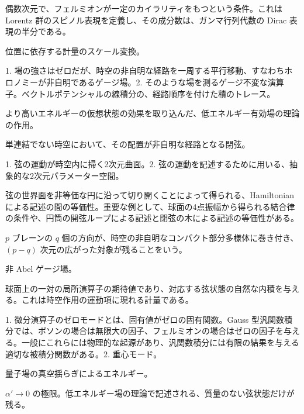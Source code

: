 {偶数次元で、フェルミオンが一定のカイラリティをもつという条件。これは Lorentz 群のスピノル表現を定義し、その成分数は、ガンマ行列代数の Dirac 表現の半分である。}

{位置に依存する計量のスケール変換。}

{1. 場の強さはゼロだが、時空の非自明な経路を一周する平行移動、すなわちホロノミーが非自明であるゲージ場。2. そのような場を測るゲージ不変な演算子。ベクトルポテンシャルの線積分の、経路順序を付けた積のトレース。}

{より高いエネルギーの仮想状態の効果を取り込んだ、低エネルギー有効場の理論の作用。}

{単連結でない時空において、その配置が非自明な経路となる閉弦。}

{1. 弦の運動が時空内に掃く2次元曲面。2. 弦の運動を記述するために用いる、抽象的な2次元パラメーター空間。}

{弦の世界面を非等価な円に沿って切り開くことによって得られる、Hamiltonian による記述の間の等価性。重要な例として、球面の4点振幅から得られる結合律の条件や、円筒の開弦ループによる記述と閉弦の木による記述の等価性がある。}

{$p$ ブレーンの $q$ 個の方向が、時空の非自明なコンパクト部分多様体に巻き付き、$(p-q)$ 次元の広がった対象が残ることをいう。}

{非 Abel ゲージ場。}

{球面上の一対の局所演算子の期待値であり、対応する弦状態の自然な内積を与える。これは時空作用の運動項に現れる計量である。}

{1. 微分演算子のゼロモードとは、固有値がゼロの固有関数。Gauss 型汎関数積分では、ボソンの場合は無限大の因子、フェルミオンの場合はゼロの因子を与える。一般にこれらには物理的な起源があり、汎関数積分には有限の結果を与える適切な被積分関数がある。2. 重心モード。}

{量子場の真空揺らぎによるエネルギー。}

{$\alpha'\to0$ の極限。低エネルギー場の理論で記述される、質量のない弦状態だけが残る。}
